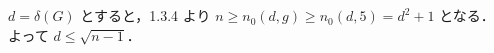 \subsection{}
$d = \delta(G)$ とすると，1.3.4 より $n \geq n_0(d, g) \geq n_0(d, 5) = d^2 + 1$ となる．
よって $d\leq \sqrt{n-1}$．